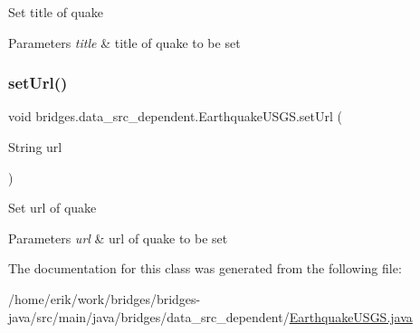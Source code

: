 Set title of quake


\begin{DoxyParams}{Parameters}
{\em title} & title of quake to be set \\
\hline
\end{DoxyParams}
\mbox{\label{classbridges_1_1data__src__dependent_1_1_earthquake_u_s_g_s_aaa9d26333e7b80d0f72da58ea2ad41d1}} 
\subsubsection{\texorpdfstring{set\+Url()}{setUrl()}}
{\footnotesize\ttfamily void bridges.\+data\+\_\+src\+\_\+dependent.\+Earthquake\+U\+S\+G\+S.\+set\+Url (\begin{DoxyParamCaption}\item[{String}]{url }\end{DoxyParamCaption})}

Set url of quake


\begin{DoxyParams}{Parameters}
{\em url} & url of quake to be set \\
\hline
\end{DoxyParams}


The documentation for this class was generated from the following file\+:\begin{DoxyCompactItemize}
\item 
/home/erik/work/bridges/bridges-\/java/src/main/java/bridges/data\+\_\+src\+\_\+dependent/\hyperlink{_earthquake_u_s_g_s_8java}{Earthquake\+U\+S\+G\+S.\+java}\end{DoxyCompactItemize}
